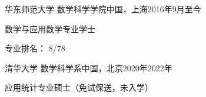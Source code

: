
\begin{eduitem}{华东师范大学 数学科学学院}{中国，上海}{2016年9月}{至今}
\item 数学与应用数学专业学士
\item 专业排名： 8/78
\end{eduitem}

\begin{eduitem}{清华大学 数学科学系}{中国，北京}{2020年}{2022年}
    \item 应用统计专业硕士（免试保送，未入学）
\end{eduitem}

\endinput
